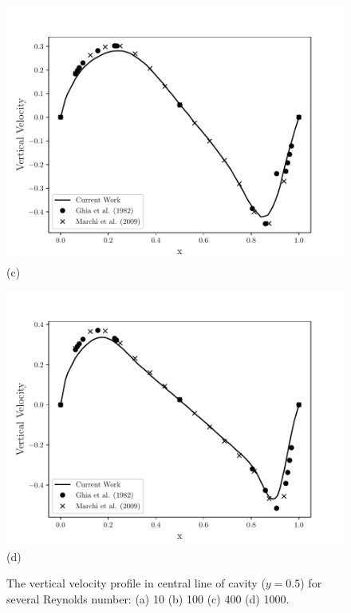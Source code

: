 \begin{figure}[H]
\begin{minipage}{.5\linewidth}
      \centering
      \includegraphics[scale=0.53]{./02_chaps/cap_validation/figure/Re_400_v_profile.pdf}\\
      (c)
     \end{minipage}%
     \begin{minipage}{.5\linewidth}
      \centering
      \includegraphics[scale=0.53]{./02_chaps/cap_validation/figure/Re_1000_v_profile.pdf}\\
      (d)
     \end{minipage}
     \medskip
     \caption{The vertical velocity profile in central line of cavity ($y=0.5$) for several Reynolds number:
     (a) 10
     (b) 100
     (c) 400
     (d) 1000.}
     \label{velocity vy cavity}
\end{figure}

